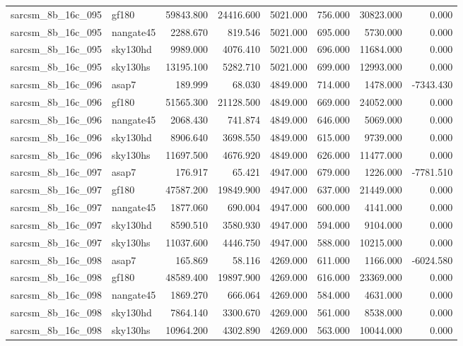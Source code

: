 \begin{tabular}{llrrrrrr}
sarcsm\_8b\_16c\_095 & gf180 & 59843.800 & 24416.600 & 5021.000 & 756.000 & 30823.000 & 0.000 \\
sarcsm\_8b\_16c\_095 & nangate45 & 2288.670 & 819.546 & 5021.000 & 695.000 & 5730.000 & 0.000 \\
sarcsm\_8b\_16c\_095 & sky130hd & 9989.000 & 4076.410 & 5021.000 & 696.000 & 11684.000 & 0.000 \\
sarcsm\_8b\_16c\_095 & sky130hs & 13195.100 & 5282.710 & 5021.000 & 699.000 & 12993.000 & 0.000 \\
sarcsm\_8b\_16c\_096 & asap7 & 189.999 & 68.030 & 4849.000 & 714.000 & 1478.000 & -7343.430 \\
sarcsm\_8b\_16c\_096 & gf180 & 51565.300 & 21128.500 & 4849.000 & 669.000 & 24052.000 & 0.000 \\
sarcsm\_8b\_16c\_096 & nangate45 & 2068.430 & 741.874 & 4849.000 & 646.000 & 5069.000 & 0.000 \\
sarcsm\_8b\_16c\_096 & sky130hd & 8906.640 & 3698.550 & 4849.000 & 615.000 & 9739.000 & 0.000 \\
sarcsm\_8b\_16c\_096 & sky130hs & 11697.500 & 4676.920 & 4849.000 & 626.000 & 11477.000 & 0.000 \\
sarcsm\_8b\_16c\_097 & asap7 & 176.917 & 65.421 & 4947.000 & 679.000 & 1226.000 & -7781.510 \\
sarcsm\_8b\_16c\_097 & gf180 & 47587.200 & 19849.900 & 4947.000 & 637.000 & 21449.000 & 0.000 \\
sarcsm\_8b\_16c\_097 & nangate45 & 1877.060 & 690.004 & 4947.000 & 600.000 & 4141.000 & 0.000 \\
sarcsm\_8b\_16c\_097 & sky130hd & 8590.510 & 3580.930 & 4947.000 & 594.000 & 9104.000 & 0.000 \\
sarcsm\_8b\_16c\_097 & sky130hs & 11037.600 & 4446.750 & 4947.000 & 588.000 & 10215.000 & 0.000 \\
sarcsm\_8b\_16c\_098 & asap7 & 165.869 & 58.116 & 4269.000 & 611.000 & 1166.000 & -6024.580 \\
sarcsm\_8b\_16c\_098 & gf180 & 48589.400 & 19897.900 & 4269.000 & 616.000 & 23369.000 & 0.000 \\
sarcsm\_8b\_16c\_098 & nangate45 & 1869.270 & 666.064 & 4269.000 & 584.000 & 4631.000 & 0.000 \\
sarcsm\_8b\_16c\_098 & sky130hd & 7864.140 & 3300.670 & 4269.000 & 561.000 & 8538.000 & 0.000 \\
sarcsm\_8b\_16c\_098 & sky130hs & 10964.200 & 4302.890 & 4269.000 & 563.000 & 10044.000 & 0.000 \\

\end{tabular}
